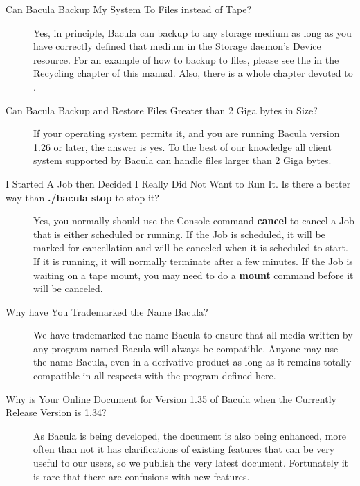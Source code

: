\begin{description}
\label{disk}
\item [Can Bacula Backup My System To Files instead of Tape? ]
   Yes, in principle, Bacula can backup to any storage  medium as long as you
   have correctly defined that medium in the  Storage daemon's Device resource.
   For an example of how to backup  to files, please see the  
    in the  Recycling
   chapter of this manual. Also, there is a whole chapter  devoted to 
   .  

\label{bigfiles}
\item [Can Bacula Backup and Restore Files Greater than 2 Giga bytes in
   Size?  ]
If your operating system permits it, and you are running Bacula  version 1.26
or later, the answer is yes. To the best of our  knowledge all client system
supported by Bacula can handle  files larger than 2 Giga bytes.  

\label{cancel}
\item [I Started A Job then Decided I Really Did Not Want to Run It. Is
   there  a better way than {\bf ./bacula stop} to stop it?]
    Yes,
   you normally should use the Console command {\bf cancel} to cancel a Job
   that is either scheduled or running.  If the Job is scheduled, it will
   be marked for cancellation and will be canceled when it is scheduled to
   start.  If it is running, it will normally terminate after a few
   minutes.  If the Job is waiting on a tape mount, you may need to do a
   {\bf mount} command before it will be canceled.

\label{trademark}
\item [Why have You Trademarked the Name
   Bacula\raisebox{.6ex}{{\footnotesize \textsuperscript{\textregistered}}}?]
We have trademarked the name Bacula to ensure that all media  written by any
program named Bacula will always be compatible. Anyone  may use the name
Bacula, even in a derivative product as long as it  remains totally compatible
in all respects with the program defined  here.

\label{docversion}
\item [Why is Your Online Document for Version 1.35 of Bacula when the
   Currently  Release Version is 1.34?]
As Bacula is being developed, the document is also being enhanced, more  often
than not it has clarifications of existing features that  can be very useful
to our users, so we publish the very latest  document. Fortunately it is rare
that there are confusions with  new features.  


\end{description}
